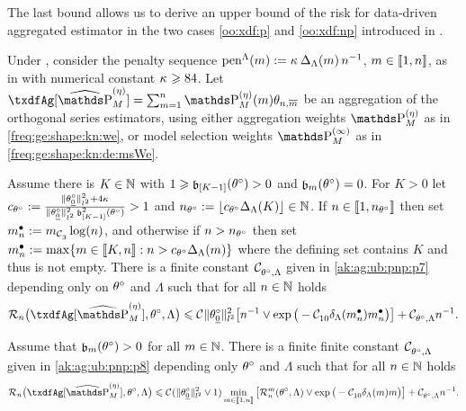 \begin{te} The last bound allows us to derive an upper bound of the
  risk for  data-driven aggregated estimator  in the two cases
  \ref{oo:xdf:p} and \ref{oo:xdf:np} introduced in .
\end{te}
\begin{thm}\label{freq:ge:strat:kn:qu:pnp}
Under , consider the penalty sequence $\penSv:=\penD$, $\Di\in\nset{1,n}$, as in  with numerical constant $\cpen \geq 84$.
Let $\txdfAg[{\erWe[]}]=\sum_{\Di=1}^{\ssY}\We\txdfPr$ be an aggregation of the orthogonal series estimators, using either aggregation weights $\rWe[]$ as in \eqref{freq:ge:shape:kn:we}, or model selection weights $\msWe[]$ as in \eqref{freq:ge:shape:kn:de:msWe}.
\begin{Liste}[]
\item[\mylabel{ak:ag:ub:pnp:p}{\dgrau\bfseries{(p)}}]Assume there is $K\in\Nz$
  with   $1\geq \bias[{[K-1] }](\xdf)>0$ and $\bias[\Di](\xdf)=0$. For
  $K>0$ let
  $ c_{\xdf}:=\tfrac{\Vnormlp{\xdf_{\underline{0}}}^2+4\cpen}{\Vnormlp{\xdf_{\underline{0}}}^2\bias[{[K-1]}]^2(\xdf)}>1$ and
  $\ssY_{\xdf}:=\gauss{c_{\xdf}\DipenSv[K]}\in\Nz$. If
  $\ssY\in\nset{1,\ssY_{\xdf}}$ then set $\sDi{\ssY}:=\Di_{\cst{3}}\log(\ssY)$, and otherwise if
  $\ssY>\ssY_{\xdf}$ then set
  $\sDi{\ssY}:=\max\{\Di\in\nset{K,\ssY}:\ssY>c_{\xdf}\DipenSv\}$
  where the defining set contains $K$ and thus is not empty.
There is a finite constant $\cst{\xdf,\Lambda}$
given in \eqref{ak:ag:ub:pnp:p7} depending only on $\xdf$ and $\Lambda$ such that for all $n\in\Nz$ holds
\begin{equation}\label{ak:ag:ub:pnp:e1}
  \nRi{\txdfAg[{\erWe[]}]}{\xdf,\Lambda}
  \leq
  \cst{}\Vnormlp{\xdf_{\underline{0}}}^2\big[
  \ssY^{-1}\vee\exp\big(-\cst{10}\cmiSv[\sDi{\ssY}]\sDi{\ssY}\big)\big]
  + \cst{\xdf,\Lambda}\ssY^{-1}.
\end{equation}
\item[\mylabel{ak:ag:ub:pnp:np}{\dgrau\bfseries{(np)}}] Assume that
  $\bias(\xdf)>0$ for all  $\Di\in\Nz$.
There is a finite finite constant $\cst{\xdf,\Lambda}$ given in
\eqref{ak:ag:ub:pnp:p8} depending only $\xdf$ and $\Lambda$ such that for all
$\ssY\in\Nz$  holds 
 \begin{equation}\label{ak:ag:ub:pnp:e2}
   \nRi{\txdfAg[{\erWe[]}]}{\xdf,\Lambda}
    \leq 
   \cst{}(\Vnormlp{\xdf_{\underline{0}}}^2\vee1)\min_{\Di\in\nset{1,\ssY}}\big[\dRa{\Di}{\xdf,\Lambda}\vee\exp\big(-\cst{10}\cmiSv\Di\big)\big]\\
   +\cst{\xdf,\Lambda}\ssY^{-1}.
\end{equation}
\end{Liste}  
\end{thm}

